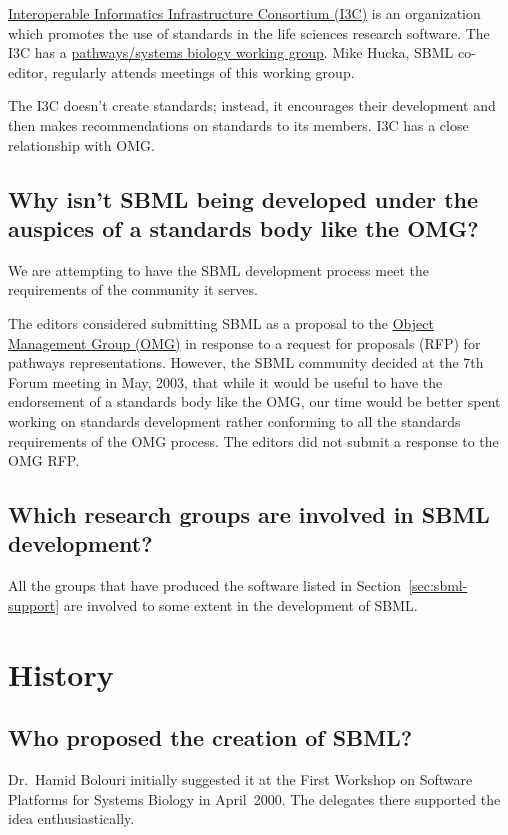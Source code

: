 \documentclass{sbmlfaq}
\begin{document}
\href{http://www.i3c.org/}{Interoperable Informatics Infrastructure Consortium (I3C)} is an organization 
which promotes the use of standards in the life sciences research software.  The I3C has a 
\href{http://www.i3c.org/wgr/psb/psb.asp}{pathways/systems biology working group}.  Mike Hucka, SBML co-editor,
regularly attends meetings of this working group.  

The I3C doesn't create standards; instead, it encourages their development and then makes recommendations
on standards to its members.  I3C has a close relationship with OMG.

\subsection{Why isn't SBML being developed under the auspices of a
  standards body like the OMG?} 

We are attempting to have the SBML development process meet the
requirements of the community it serves.

The editors considered submitting SBML as a proposal to the
\href{http://www.omg.org/}{Object Management Group (OMG)} in response to a
request for proposals (RFP) for pathways representations.  However, the
SBML community decided at the 7th Forum meeting in May, 2003, that while it
would be useful to have the endorsement of a standards body like the OMG,
our time would be better spent working on standards development rather
conforming to all the standards requirements of the OMG process.  The
editors did not submit a response to the OMG RFP.


\subsection{Which research groups are involved in SBML development?}

All the groups that have produced the software listed in Section~\ref{sec:sbml-support} are involved
to some extent in the development of SBML.

\section{History}
\label{sec:history}

\subsection{Who proposed the creation of SBML?}

Dr.\ Hamid Bolouri initially suggested it at the First Workshop on Software
Platforms for Systems Biology in April~2000.  The delegates there supported
the idea enthusiastically.
\end{document}

